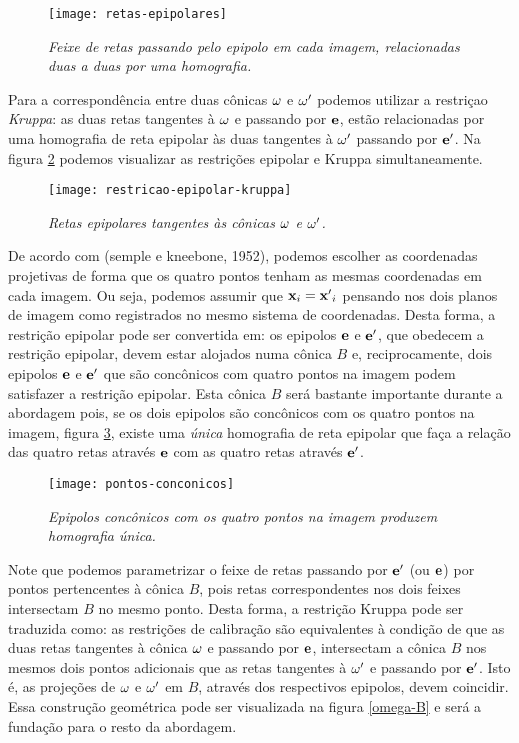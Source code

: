 \begin{figure}[!htb]
\centering
\texttt{[image: retas-epipolares]}
\caption{\textit{Feixe de retas passando pelo epipolo em cada imagem, relacionadas duas a duas por uma homografia.}}
\label{retas-epipolares}
\end{figure}

Para a correspondência entre duas cônicas ${\bf \omega}$ e ${\bf \omega'}$ podemos utilizar a restriçao \textit{Kruppa}: as duas retas tangentes à ${\bf \omega}$ e passando por ${\bf e}$, estão relacionadas por uma homografia de reta epipolar às duas tangentes à ${\bf \omega'}$ passando por ${\bf e'}$. Na figura \ref{epipolar-kruppa} podemos visualizar as restrições epipolar e Kruppa simultaneamente.

\begin{figure}[!htb]
\centering
\texttt{[image: restricao-epipolar-kruppa]}
\caption{\textit{Retas epipolares tangentes às cônicas ${\bf \omega}$ e ${\bf \omega'}$.}}
\label{epipolar-kruppa}
\end{figure}

De acordo com (semple e kneebone, 1952), podemos escolher as coordenadas projetivas de forma que os quatro pontos tenham as mesmas coordenadas em cada imagem. Ou seja, podemos assumir que ${\bf x}_i = {\bf x'}_i$ pensando nos dois planos de imagem como registrados no mesmo sistema de coordenadas. Desta forma, a restrição epipolar pode ser convertida em: os epipolos ${\bf e}$ e ${\bf e'}$, que obedecem a restrição epipolar, devem estar alojados numa cônica $B$ e, reciprocamente, dois epipolos ${\bf e}$ e ${\bf e'}$ que são concônicos com quatro pontos na imagem podem satisfazer a restrição epipolar. Esta cônica $B$ será bastante importante durante a abordagem pois, se os dois epipolos são concônicos com os quatro pontos na imagem, figura \ref{pontos-conconicos}, existe uma \textit{única} homografia de reta epipolar que faça a relação das quatro retas através ${\bf e}$ com as quatro retas através ${\bf e'}$. 

\begin{figure}[!htb]
\centering
\texttt{[image: pontos-conconicos]}
\caption{\textit{Epipolos concônicos com os quatro pontos na imagem produzem homografia única.}}
\label{pontos-conconicos}
\end{figure}

Note que podemos parametrizar o feixe de retas passando por ${\bf e'}$ (ou ${\bf e}$) por pontos pertencentes à cônica $B$, pois retas correspondentes nos dois feixes intersectam $B$ no mesmo ponto. Desta forma, a restrição Kruppa pode ser traduzida como: as restrições de calibração são equivalentes à condição de que as duas retas tangentes à cônica ${\bf \omega}$ e passando por ${\bf e}$, intersectam a cônica $B$ nos mesmos dois pontos adicionais que as retas tangentes à ${\bf \omega'}$ e passando por ${\bf e'}$. Isto é, as projeções de ${\bf \omega}$ e ${\bf \omega'}$ em $B$, através dos respectivos epipolos, devem coincidir. Essa construção geométrica pode ser visualizada na figura \ref{omega-B} e será a fundação para o resto da abordagem. 


